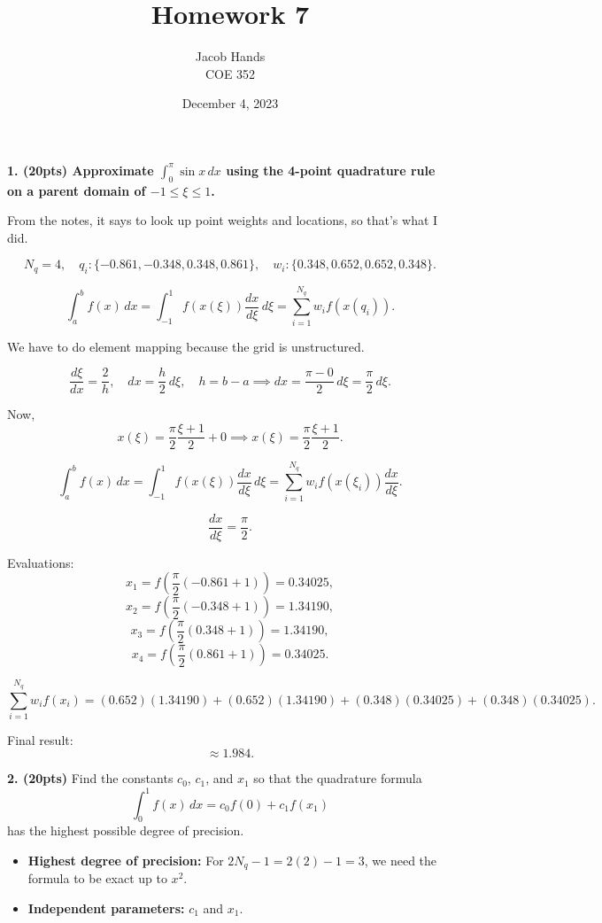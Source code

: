 \documentclass[11pt]{article}
\title{Homework 7}
\author{Jacob Hands \\ COE 352}
\date{December 4, 2023}
\begin{document}
\maketitle

\textbf{1. (20pts) Approximate $\int_0^\pi \sin x \, dx$ using the 4-point quadrature rule on a parent domain of $-1 \leq \xi \leq 1$.}

From the notes, it says to look up point weights and locations, so that's what I did.

\[
N_q = 4, \quad q_i: \{-0.861, -0.348, 0.348, 0.861\}, \quad w_i: \{0.348, 0.652, 0.652, 0.348\}.
\]

\[
\int_a^b f(x) \, dx = \int_{-1}^1 f(x(\xi)) \frac{dx}{d\xi} \, d\xi = \sum_{i=1}^{N_q} w_i f(x(q_i)).
\]

We have to do element mapping because the grid is unstructured.

\[
\frac{d\xi}{dx} = \frac{2}{h}, \quad dx = \frac{h}{2} \, d\xi, \quad h = b-a \implies dx = \frac{\pi - 0}{2} \, d\xi = \frac{\pi}{2} \, d\xi.
\]

Now,
\[
x(\xi) = \frac{\pi}{2} \frac{\xi + 1}{2} + 0 \implies x(\xi) = \frac{\pi}{2} \frac{\xi + 1}{2}.
\]

\[
\int_a^b f(x) \, dx = \int_{-1}^1 f(x(\xi)) \frac{dx}{d\xi} \, d\xi = \sum_{i=1}^{N_q} w_i f(x(\xi_i)) \frac{dx}{d\xi}.
\]

\[
\frac{dx}{d\xi} = \frac{\pi}{2}.
\]

Evaluations:
\[
x_1 = f\left(\frac{\pi}{2}(-0.861 + 1)\right) = 0.34025,
\]
\[
x_2 = f\left(\frac{\pi}{2}(-0.348 + 1)\right) = 1.34190,
\]
\[
x_3 = f\left(\frac{\pi}{2}(0.348 + 1)\right) = 1.34190,
\]
\[
x_4 = f\left(\frac{\pi}{2}(0.861 + 1)\right) = 0.34025.
\]

\[
\sum_{i=1}^{N_q} w_i f(x_i) = (0.652)(1.34190) + (0.652)(1.34190) + (0.348)(0.34025) + (0.348)(0.34025).
\]

Final result:
\[
\approx 1.984.
\]

\textbf{2. (20pts)} Find the constants \(c_0\), \(c_1\), and \(x_1\) so that the quadrature formula 
\[
\int_0^1 f(x) \, dx = c_0 f(0) + c_1 f(x_1)
\]
has the highest possible degree of precision.

\begin{itemize}
    \item \textbf{Highest degree of precision:} For \(2N_q - 1 = 2(2) - 1 = 3\), we need the formula to be exact up to \(x^2\).
    \item \textbf{Independent parameters:} \(c_1\) and \(x_1\).
\end{itemize}
\end{document}
